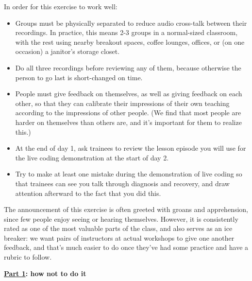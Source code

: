 In order for this exercise to work well:

\begin{itemize}

\item
  Groups must be physically separated to reduce audio cross-talk
  between their recordings. In practice, this means 2-3 groups in a
  normal-sized classroom, with the rest using nearby breakout spaces,
  coffee lounges, offices, or (on one occasion) a janitor's storage
  closet.

\item
  Do all three recordings before reviewing any of them, because
  otherwise the person to go last is short-changed on time.

\item
  People must give feedback on themselves, as well as giving feedback
  on each other, so that they can calibrate their impressions of their
  own teaching according to the impressions of other people. (We find
  that most people are harder on themselves than others are, and it's
  important for them to realize this.)

\item
  At the end of day 1, ask trainees to review the lesson episode you
  will use for the live coding demonstration at the start of day 2.

\item
  Try to make at least one mistake during the demonstration of live
  coding so that trainees can see you talk through diagnosis and
  recovery, and draw attention afterward to the fact that you did
  this.

\end{itemize}

The announcement of this exercise is often greeted with groans and
apprehension, since few people enjoy seeing or hearing themselves.
However, it is consistently rated as one of the most valuable parts of
the class, and also serves as an ice breaker: we want pairs of
instructors at actual workshops to give one another feedback, and
that's much easier to do once they've had some practice and have a
rubric to follow.


\noindent
\textbf{\href{https://youtu.be/bXxBeNkKmJE}{Part 1}: how not to do it}

